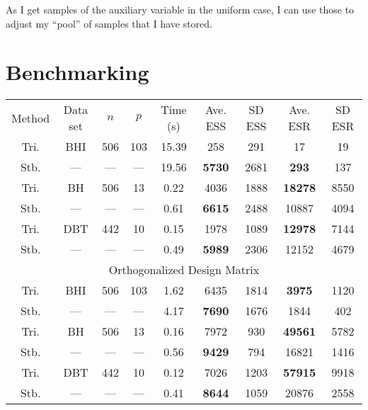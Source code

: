 \documentclass{article}
\begin{document}
As I get samples of the auxiliary variable in the uniform case, I can use those
to adjust my ``pool'' of samples that I have stored.

\section{Benchmarking}

\begin{table}
\centering
\begin{tabular}{c c c c c c c c c}
Method & Data set & $n$ & $p$ & Time (s) & Ave. ESS & SD ESS & Ave. ESR & SD ESR \\
Tri. & BHI & 506 & 103 & 15.39 & 258  &  291 &    17 &  19 \\
Stb. & --- & --- & --- & 19.56 & {\bf 5730} & 2681 & {\bf 293} & 137 \\

Tri. & BH  & 506 & 13  &  0.22 & 4036 & 1888 & {\bf 18278} & 8550 \\ 
Stb. & --- & --- & --- &  0.61 & {\bf 6615} & 2488 & 10887 & 4094 \\

Tri. & DBT & 442 & 10  &  0.15 & 1978 & 1089 & {\bf 12978} & 7144 \\
Stb. & --- & --- & --- &  0.49 & {\bf 5989} & 2306 & 12152 & 4679 \\

\multicolumn{9}{c}{Orthogonalized Design Matrix} \\

Tri. & BHI & 506 & 103 &  1.62 & 6435 & 1814 &  {\bf 3975} & 1120 \\
Stb. & --- & --- & --- &  4.17 & {\bf 7690} & 1676 &  1844 &  402 \\

Tri. & BH  & 506 & 13  &  0.16 & 7972 &  930 & {\bf 49561} & 5782 \\ 
Stb. & --- & --- & --- &  0.56 & {\bf 9429} &  794 & 16821 & 1416 \\

Tri. & DBT & 442 & 10  &  0.12 & 7026 & 1203 & {\bf 57915} & 9918 \\
Stb. & --- & --- & --- &  0.41 & {\bf 8644} & 1059 & 20876 & 2558 \\

\end{tabular}
\end{table}
\end{document}
